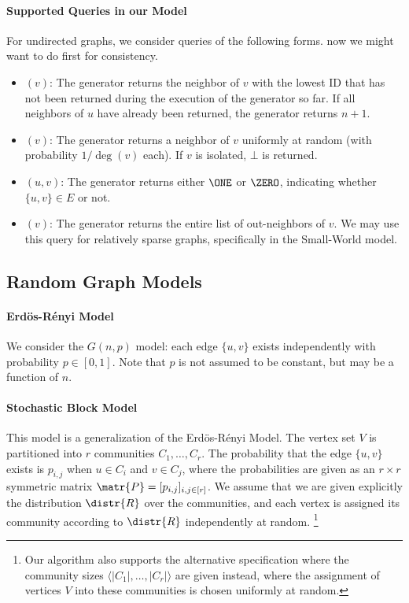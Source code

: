 \paragraph*{Supported Queries in our Model} 
For undirected graphs, we consider queries of the following forms.
now we might want to do  first for consistency.
\begin{itemize}
\item {}$(v)$: The generator returns the neighbor of $v$ with the lowest ID that has not been returned during the execution of the generator so far. If all neighbors of $u$ have already been returned, the generator returns $n+1$.
\item {}$(v)$: The generator returns a neighbor of $v$ uniformly at random (with probability $1/\deg(v)$ each). If $v$ is isolated, $\bot$ is returned.
\item {}$(u,v)$: The generator returns either $\ONE$ or $\ZERO$, indicating whether $\{u,v\}\in E$ or not.
\item {}$(v)$: The generator returns the entire list of out-neighbors of $v$. We may use this query for relatively sparse graphs, specifically in the Small-World model.
\end{itemize}

\subsection{Random Graph Models}
\label{sec:graph_model}

\paragraph*{Erd\"{o}s-R\'{e}nyi Model}
We consider the $G(n, p)$ model: each edge $\{u,v\}$ exists independently with probability $p \in [0, 1]$.
Note that $p$ is not assumed to be constant, but may be a function of $n$.

\paragraph*{Stochastic Block Model}
This model is a generalization of the Erd\"{o}s-R\'{e}nyi Model.
The vertex set $V$ is partitioned into $r$ communities $C_1, \ldots, C_r$.
The probability that the edge $\{u,v\}$ exists is $p_{i,j}$ when $u\in C_i$ and $v\in C_j$,
where the probabilities are given as an $r\times r$ symmetric matrix $\matr{P} = [p_{i,j}]_{i,j \in [r]}$.
We assume that we are given explicitly the distribution $\distr{R}$ over the communities,
and each vertex is assigned its community according to $\distr{R}$ independently at random.
\footnote{Our algorithm also supports the alternative specification where the community sizes $\langle |C_1|, \ldots, |C_r|\rangle$ are given instead,
where the assignment of vertices $V$ into these communities is chosen uniformly at random.}

